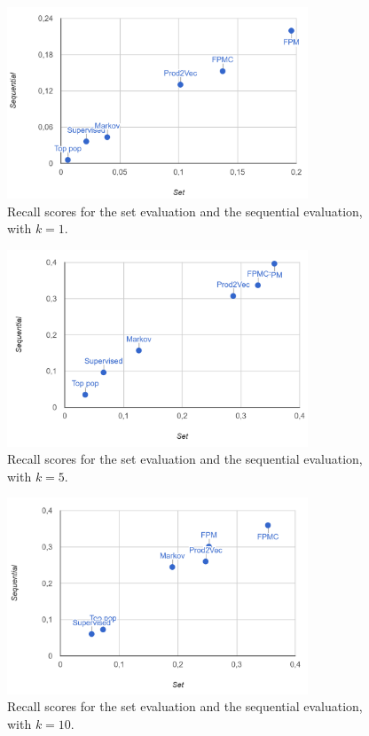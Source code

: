 \documentclass[prodmode,acmtecs]{acmsmall} %
\begin{document}
\begin{figure}[H]
	\centering			
	\includegraphics[width=0.8\textwidth]{img/recall_k_1.png}
	\caption{Recall scores for the set evaluation and the sequential evaluation, with $k=1$.}
	\label{img:recall_k_1}
\end{figure}

\begin{figure}[H]
	\centering			
	\includegraphics[width=0.8\textwidth]{img/recall_k_5.png}
	\caption{Recall scores for the set evaluation and the sequential evaluation, with $k=5$.}
	\label{img:recall_k_5}
\end{figure}

\begin{figure}[H]
	\centering			
	\includegraphics[width=0.8\textwidth]{img/recall_k_10.png}
	\caption{Recall scores for the set evaluation and the sequential evaluation, with $k=10$.}
	\label{img:recall_k_10}
\end{figure}
\end{document}
